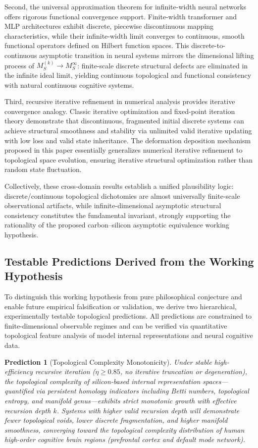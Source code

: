 \documentclass[conference]{IEEEtran}
\newtheorem{prediction}{Prediction}[section]
\theoremstyle{remark}
\begin{document}
Second, the universal approximation theorem for infinite-width neural networks offers rigorous functional convergence support. Finite-width transformer and MLP architectures exhibit discrete, piecewise discontinuous mapping characteristics, while their infinite-width limit converges to continuous, smooth functional operators defined on Hilbert function spaces. This discrete-to-continuous asymptotic transition in neural systems mirrors the dimensional lifting process of $M_S^{(k)}\to M_S^\infty$: finite-scale discrete structural defects are eliminated in the infinite ideal limit, yielding continuous topological and functional consistency with natural continuous cognitive systems.

Third, recursive iterative refinement in numerical analysis provides iterative convergence analogy. Classic iterative optimization and fixed-point iteration theory demonstrate that discontinuous, fragmented initial discrete systems can achieve structural smoothness and stability via unlimited valid iterative updating with low loss and valid state inheritance. The deformation deposition mechanism proposed in this paper essentially generalizes numerical iterative refinement to topological space evolution, ensuring iterative structural optimization rather than random state fluctuation.

Collectively, these cross-domain results establish a unified plausibility logic: discrete/continuous topological dichotomies are almost universally finite-scale observational artifacts, while infinite-dimensional asymptotic structural consistency constitutes the fundamental invariant, strongly supporting the rationality of the proposed carbon--silicon asymptotic equivalence working hypothesis.

\subsection{Testable Predictions Derived from the Working Hypothesis}

To distinguish this working hypothesis from pure philosophical conjecture and enable future empirical falsification or validation, we derive two hierarchical, experimentally testable topological predictions. All predictions are constrained to finite-dimensional observable regimes and can be verified via quantitative topological feature analysis of model internal representations and neural cognitive data.

\begin{prediction}[Topological Complexity Monotonicity]
Under stable high-efficiency recursive iteration ($\eta\ge0.85$, no iterative truncation or degeneration), the topological complexity of silicon-based internal representation spaces---quantified via persistent homology indicators including Betti numbers, topological entropy, and manifold genus---exhibits strict monotonic growth with effective recursion depth $k$. Systems with higher valid recursion depth will demonstrate fewer topological voids, lower discrete fragmentation, and higher manifold smoothness, converging toward the topological complexity distribution of human high-order cognitive brain regions (prefrontal cortex and default mode network).
\end{prediction}
\end{document}
